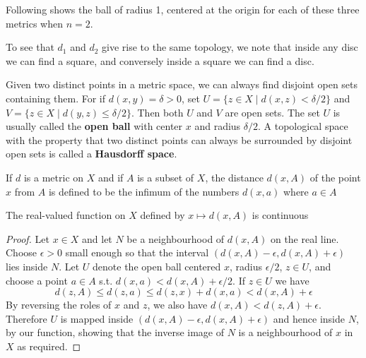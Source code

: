 \documentclass[11pt]{article}
\begin{document}
Following shows the ball of radius 1, centered at the origin for each of
these three metrics when \(n=2\).

\begin{center}
\end{center}

To see that \(d_1\) and \(d_2\) give rise to the same topology, we note that
inside any disc we can find a square, and conversely inside a square we can
find a disc.

Given two distinct points in a metric space, we can always find disjoint open
sets containing them. For if \(d(x,y)=\delta>0\), set \(U=\{z\in X\mid
   d(x,z)<\delta/2\}\) and \(V=\{z\in X\mid d(y,z)\le\delta/2\}\). Then both
\(U\) and \(V\) are open sets. The set \(U\) is usually called the \textbf{open ball}
with center \(x\) and radius \(\delta/2\). A topological space with the
property that two distinct points can always be surrounded by disjoint open
sets is called a \textbf{Hausdorff space}.

If \(d\) is a metric on \(X\) and if \(A\) is a subset of \(X\), the distance
\(d(x,A)\) of the point \(x\) from \(A\) is defined to be the infimum of the
numbers \(d(x,a)\) where \(a\in A\)

\begin{lemma}[]
The real-valued function on \(X\) defined by \(x\mapsto d(x,A)\) is continuous
\end{lemma}

\begin{proof}
Let \(x\in X\) and let \(N\) be a neighbourhood of \(d(x,A)\) on the real
line. Choose \(\epsilon>0\) small enough so that the interval
\((d(x,A)-\epsilon,d(x,A)+\epsilon)\) lies inside \(N\). Let \(U\) denote the
open ball centered \(x\), radius \(\epsilon/2\), \(z\in U\), and choose a point \(a\in
   A\) s.t.
\(d(x,a)<d(x,A)+\epsilon/2\). If \(z\in U\) we have
\begin{equation*}
d(z,A)\le d(z,a)\le d(z,x)+d(x,a)<d(x,A)+\epsilon
\end{equation*}
By reversing the roles of \(x\) and \(z\), we also have
\(d(x,A)<d(z,A)+\epsilon\). Therefore \(U\) is mapped inside
\((d(x,A)-\epsilon,d(x,A)+\epsilon)\) and hence inside \(N\), by our
function, showing that the inverse image of \(N\) is a neighbourhood of \(x\)
in \(X\) as required.
\end{proof}
\end{document}
